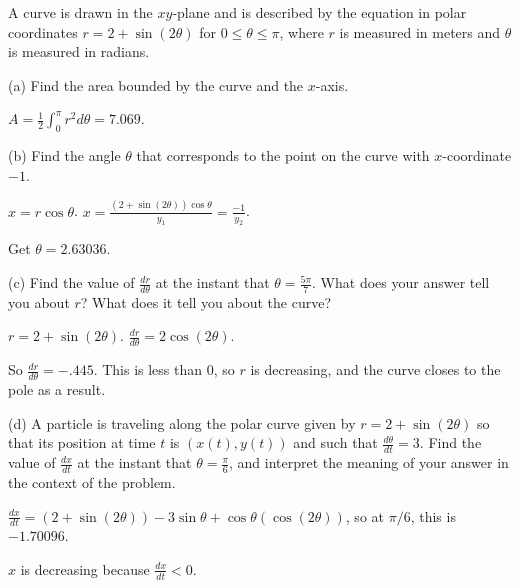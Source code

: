 \documentclass[../bccalc.tex]{subfiles}
\begin{document}
\begin{example}
    A curve is drawn in the $xy$-plane and is described by the equation in polar coordinates $r=2+\sin(2\theta)$ for $0\leq \theta\leq \pi$, where $r$ is measured in meters and $\theta$ is measured in radians.

    (a) Find the area bounded by the curve and the $x$-axis.

    $A=\frac{1}{2}\int_0^{\pi}r^2 d\theta = 7.069$.

    (b) Find the angle $\theta$ that corresponds to the point on the curve with $x$-coordinate $-1$.

    $x=r\cos\theta$. $x=\frac{(2+\sin(2\theta))\cos\theta}{y_1}=\frac{-1}{y_2}$.

    Get $\theta =2.63036$.

    (c) Find the value of $\frac{dr}{d\theta}$ at the instant that $\theta=\frac{5\pi}{7}$. What does your answer tell you about $r$? What does it tell you about the curve?

    $r=2+\sin(2\theta)$. $\frac{dr}{d\theta}=2\cos(2\theta)$.

    So $\frac{dr}{d\theta}=-.445$. This is less than 0, so $r$ is decreasing, and the curve closes to the pole as a result.

    (d) A particle is traveling along the polar curve given by $r=2+\sin(2\theta)$ so that its position at time $t$ is $(x(t),y(t))$ and such that $\frac{d\theta}{dt}=3$. Find the value of $\frac{dx}{dt}$ at the instant that $\theta=\frac{\pi}{6}$, and interpret the meaning of your answer in the context of the problem.

    $\frac{dx}{dt}=(2+\sin(2\theta))-3\sin\theta+\cos\theta(\cos(2\theta))$, so at $\pi/6$, this is $-1.70096$.

    $x$ is decreasing because $\frac{dx}{dt}<0$.
\end{example}
\end{document}
